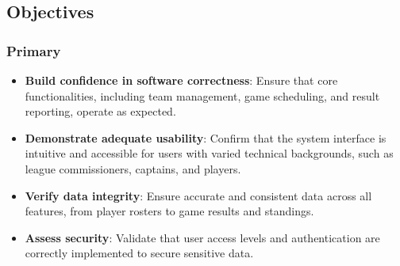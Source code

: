 \documentclass[12pt, titlepage]{article}
\begin{document}
\subsection{Objectives}

\subsubsection*{Primary}
\begin{itemize}
    \item \textbf{Build confidence in software correctness}: Ensure that core functionalities, including team management, game scheduling, and result reporting, operate as expected.
    \item \textbf{Demonstrate adequate usability}: Confirm that the system interface is intuitive and accessible for users with varied technical backgrounds, such as league commissioners, captains, and players.
    \item \textbf{Verify data integrity}: Ensure accurate and consistent data across all features, from player rosters to game results and standings.
    \item \textbf{Assess security}: Validate that user access levels and authentication are correctly implemented to secure sensitive data.
\end{itemize}
\end{document}
